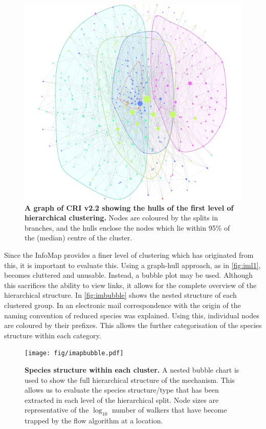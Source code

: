 \begin{figure}[H]
  \centering
  \includegraphics[width=\textwidth]{fig/crigroups.png}
  \caption{\textbf{A graph of CRI v2.2 showing the hulls of the first level of hierarchical clustering.} Nodes are coloured by the splits in branches, and the hulls enclose the nodes which lie within 95\% of the (median) centre of the cluster.}
    \label{fig:iml1}
\end{figure}

Since the InfoMap provides a finer level of clustering which has originated from this, it is important to evaluate this. Using a graph-hull approach, as in \autoref{fig:iml1}, becomes cluttered and unusable. Instead, a bubble plot may be used. Although this sacrifices the ability to view links, it allows for the complete overview of the hierarchical structure. In \autoref{fig:imbubble} shows the nested structure of each clustered group. In an electronic mail correspondence with \cite{correspondance} the origin of the naming convention of reduced species was explained. Using this, individual nodes are coloured by their prefixes. This allows the further categorisation of the species structure within each category. 

\begin{figure}[H]
  \centering
  \texttt{[image: fig/imapbubble.pdf]}
  \caption{\textbf{Species structure within each cluster.} A nested bubble chart is used to show the full hierarchical structure of the mechanism. This allows us to evaluate the species structure/type that has been extracted in each level of the hierarchical split. Node sizes are representative of the $\log_{10}$ number of walkers that have become trapped by the flow algorithm at a location. }
    \label{fig:imbubble}
\end{figure}


